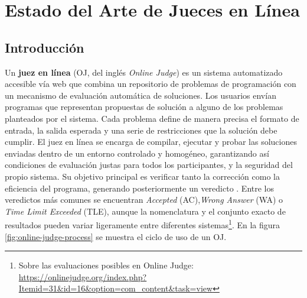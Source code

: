 \chapter{Estado del Arte de Jueces en Línea}
\label{cap:estadoDelArteDeJuecesEnLinea}

\section{Introducción}

Un \textbf{juez en línea} (OJ, del inglés \textit{Online Judge}) es un sistema automatizado accesible vía web que combina un repositorio de problemas de programación con un mecanismo de evaluación automática de soluciones. Los usuarios envían programas que representan propuestas de solución a alguno de los problemas planteados por el sistema. Cada problema define de manera precisa el formato de entrada, la salida esperada y una serie de restricciones que la solución debe cumplir. El juez en línea se encarga de compilar, ejecutar y probar las soluciones enviadas dentro de un entorno controlado y homogéneo, garantizando así condiciones de evaluación justas para todos los participantes, y la seguridad del propio sistema. Su objetivo principal es verificar tanto la corrección como la eficiencia del programa, generando posteriormente un veredicto \citep{Watanobe_Rahman_Matsumoto_Rage_Ravikumar_2022, Wasik_Antczak_Badura_Laskowski_Sternal_2019}. Entre los veredictos más comunes se encuentran \textit{Accepted} (AC),\textit{Wrong Answer} (WA) o \textit{Time Limit Exceeded} (TLE), aunque la nomenclatura y el conjunto exacto de resultados pueden variar ligeramente entre diferentes sistemas\footnote{Sobre las evaluaciones posibles en Online Judge: \url{https://onlinejudge.org/index.php?Itemid=31&id=16&option=com_content&task=view}}. En la figura \ref{fig:online-judge-process} se muestra el ciclo de uso de un OJ.

